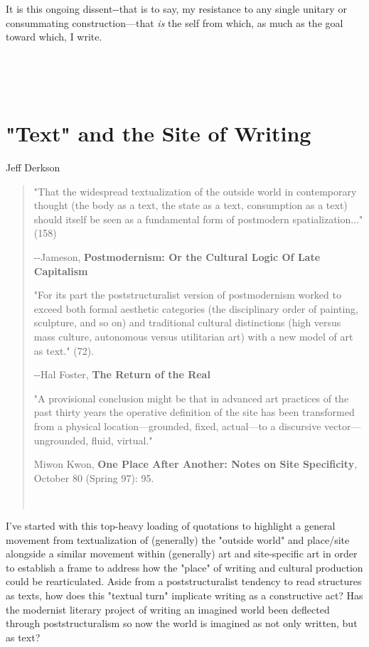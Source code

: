It is this ongoing dissent-\/-that is to say, my resistance to any
single unitary or consummating construction---that \emph{is} the self
from which, as much as the goal toward which, I write.

~

~

\hypertarget{text-and-the-site-of-writing}{%
\section{"Text" and the Site of
Writing}\label{text-and-the-site-of-writing}}

Jeff Derkson

\begin{quote}
"That the widespread textualization of the outside world in contemporary
thought (the body as a text, the state as a text, consumption as a text)
should itself be seen as a fundamental form of postmodern
spatialization..." (158)

-\/-Jameson, \textbf{Postmodernism: Or the Cultural Logic Of Late
Capitalism}

"For its part the poststructuralist version of postmodernism worked to
exceed both formal aesthetic categories (the disciplinary order of
painting, sculpture, and so on) and traditional cultural distinctions
(high versus mass culture, autonomous versus utilitarian art) with a new
model of art as text." (72).

-\/-Hal Foster, \textbf{The Return of the Real}

"A provisional conclusion might be that in advanced art practices of the
past thirty years the operative definition of the site has been
transformed from a physical location---grounded, fixed, actual---to a
discursive vector---ungrounded, fluid, virtual."

Miwon Kwon, \textbf{One Place After Another: Notes on Site Specificity},
October 80 (Spring 97): 95.

~
\end{quote}

I've started with this top-heavy loading of quotations to highlight a
general movement from textualization of (generally) the "outside world"
and place/site alongside a similar movement within (generally) art and
site-specific art in order to establish a frame to address how the
"place" of writing and cultural production could be rearticulated. Aside
from a poststructuralist tendency to read structures as texts, how does
this "textual turn" implicate writing as a constructive act? Has the
modernist literary project of writing an imagined world been deflected
through poststructuralism so now the world is imagined as not only
written, but as text?

